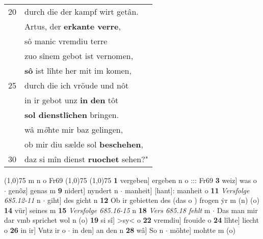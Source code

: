 \documentclass[8pt,a4paper,notitlepage]{article}
\begin{document}
\begin{table}[ht]
\begin{minipage}[t]{0.5\linewidth}
\begin{tabular}{rl}
20 & durch die der kampf wirt getân.\\ 
 & Artus, der \textbf{erkante verre},\\ 
 & sô manic vremdiu terre\\ 
 & zuo sînem gebot ist vernomen,\\ 
 & \textbf{sô} ist lîhte her mit im komen,\\ 
25 & durch die ich vröude und nôt\\ 
 & in ir gebot unz \textbf{in} \textbf{den} tôt\\ 
 & \textbf{sol dienstlîchen} bringen.\\ 
 & wâ m\textit{ö}hte mir baz gelingen,\\ 
 & ob mir diu sælde sol \textbf{beschehen},\\ 
30 & daz si mîn dienst \textbf{ruochet} sehen?"\\ 
\end{tabular}
\scriptsize
\line(1,0){75} \newline
m n o Fr69 \newline
\line(1,0){75} \newline
\newline
\line(1,0){75} \newline
\textbf{1} vergeben] ergeben n o ::: Fr69 \textbf{3} weiz] was o  $\cdot$ genôz] genas m \textbf{9} nidert] nyndert n  $\cdot$ manheit] [hant]: manheit o \textbf{11} \textit{Versfolge 685.12-11} n   $\cdot$ giht] des gicht n \textbf{12} Ob ir gebietten des (das o ) frogen ẏr m (n) (o) \textbf{14} vür] seines m \textbf{15} \textit{Versfolge 685.16-15} n  \textbf{18} \textit{Vers 685.18 fehlt} m   $\cdot$ Das man mir dar vmb sprichet wol n (o) \textbf{19} si sî] >sy< o \textbf{22} vremdiu] frouide o \textbf{24} lîhte] liecht o \textbf{26} in ir] Vntz ir o  $\cdot$ in den] an den n \textbf{28} wâ] So n  $\cdot$ möhte] mohtte m (o) \newline
\end{minipage}
\end{table}
\newpage
\end{document}

